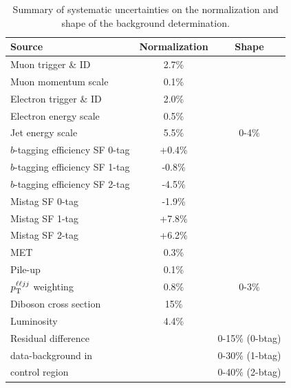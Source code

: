 \begin{table}[htb]
\caption{
Summary of systematic uncertainties on the normalization and shape of the background determination.
}
\label{table-syst-bg}
\begin{center}
\small
\begin{tabular}{|l|c|c|}
\hline
Source                           &   Normalization   &   Shape  \\ \hline \hline
Muon trigger \& ID               &  2.7\%            &          \\
Muon momentum scale              &  0.1\%            &          \\
Electron trigger \& ID           &  2.0\%            &          \\
Electron energy scale            &  0.5\%            &          \\
Jet energy scale                 &  5.5\%            &   0-4\%  \\ 
\hline
$b$-tagging efficiency SF 0-tag  & +0.4\%            &          \\ 
$b$-tagging efficiency SF 1-tag  & -0.8\%            &          \\ 
$b$-tagging efficiency SF 2-tag  & -4.5\%            &          \\ 
\hline
Mistag SF 0-tag                  & -1.9\%            &          \\ 
Mistag SF 1-tag                  & +7.8\%            &          \\ 
Mistag SF 2-tag                  & +6.2\%            &          \\ 
\hline
MET                              &  0.3\%            &          \\ 
Pile-up                          &  0.1\%            &          \\
$p_{\mathrm{T}}^{\ell\ell jj}$ weighting    &  0.8\%            &   0-3\%  \\
Diboson cross section            &  15\%             &          \\
Luminosity                       &  4.4\%           &          \\ \hline 
Residual difference              &                   &  0-15\% (0-btag) \\
data-background in               &                   &  0-30\% (1-btag) \\
control region                   &                   &  0-40\% (2-btag) \\
\hline 
\end{tabular} 
\end{center} 
\end{table} 


